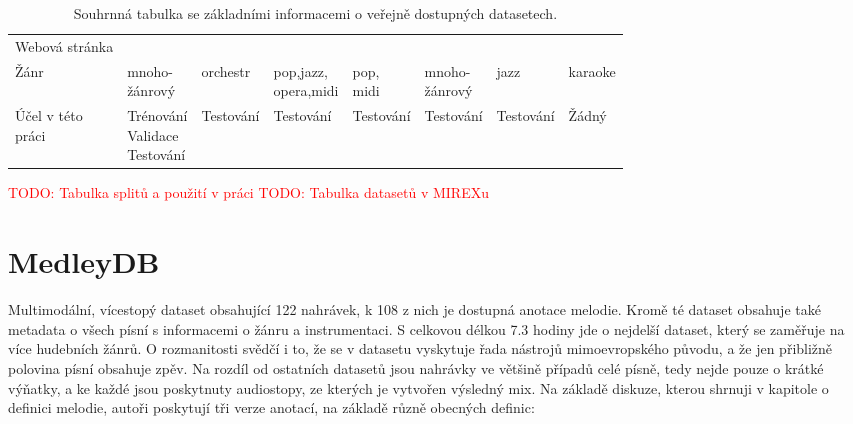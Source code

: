 \begin{table}[h!]
{\begin{tabular}{llllllll}
        Webová stránka   & \tablefootnote{\url{https://medleydb.weebly.com/}} & \tablefootnote{\url{https://www.upf.edu/web/mtg/orchset}}      & \tablefootnote{\url{http://ismir2004.ismir.net/melody_contest/results.html}}       & \tablefootnote{\url{https://labrosa.ee.columbia.edu/projects/melody/}}       & \tablefootnote{\url{http://synthdatasets.weebly.com/mdb-melody-synth.html}}        & \tablefootnote{\url{https://jazzomat.hfm-weimar.de/}}    & \tablefootnote{\url{https://sites.google.com/site/unvoicedsoundseparation/mir-1k}} \\
        Žánr    & \shortstack[l]{mnoho-\\žánrový} & orchestr & \shortstack[l]{pop,jazz,\\opera,midi} & \shortstack[l]{pop,\\midi} & \shortstack[l]{mnoho-\\žánrový} & jazz & karaoke   \\
        \shortstack[l]{Účel v této\\práci} & \shortstack[l]{Trénování\\Validace\\Testování} & Testování & Testování  & Testování  & Testování & Testování & Žádný \\
    \bottomrule
    \end{tabular}
}%

\caption{Souhrnná tabulka se základními informacemi o veřejně dostupných datasetech.}\label{tab:dataset_summary}
\end{table}


\textcolor{red}{TODO: Tabulka splitů a použití v práci}
\textcolor{red}{TODO: Tabulka datasetů v MIREXu}



\section{MedleyDB}

\cite{Bittner2014}

Multimodální, vícestopý dataset obsahující 122 nahrávek, k 108 z nich je dostupná anotace melodie. Kromě té dataset obsahuje také metadata o všech písní s informacemi o žánru a instrumentaci. S celkovou délkou 7.3 hodiny jde o nejdelší dataset, který se zaměřuje na více hudebních žánrů. O rozmanitosti svědčí i to, že se v datasetu vyskytuje řada nástrojů mimoevropského původu, a že jen přibližně polovina písní obsahuje zpěv. Na rozdíl od ostatních datasetů jsou nahrávky ve většině případů celé písně, tedy nejde pouze o krátké výňatky, a ke každé jsou poskytnuty audiostopy, ze kterých je vytvořen výsledný mix.
Na základě diskuze, kterou shrnuji v kapitole o definici melodie, autoři poskytují tři verze anotací, na základě různě obecných definic:

